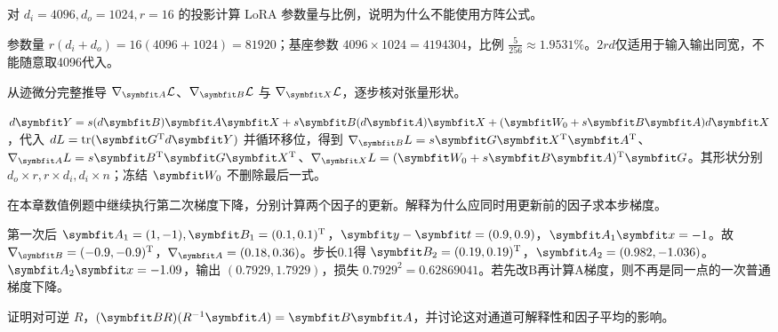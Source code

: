 
\begin{exercises}
\begin{exercise} 对 $d_i=4096,d_o=1024,r=16$ 的投影计算 LoRA 参数量与比例，说明为什么不能使用方阵公式。

\begin{solution}
参数量 $r(d_i+d_o)=16(4096+1024)=81920$；基座参数 $4096\times1024=4194304$，比例 $\frac{5}{256}\approx1.9531\%$。$2rd$仅适用于输入输出同宽，不能随意取4096代入。
\end{solution}
\end{exercise}

\begin{exercise} 从迹微分完整推导 $\nabla_{\mat{A}}\mathcal L$、$\nabla_{\mat{B}}\mathcal L$ 与 $\nabla_{\mat{X}}\mathcal L$，逐步核对张量形状。

\begin{solution}
$d\mat{Y}=s(d\mat{B})\mat{A}\mat{X}+s\mat{B}(d\mat{A})\mat{X}+(\mat{W}_0+s\mat{B}\mat{A})d\mat{X}$，代入 $dL=\operatorname{tr}(\mat{G}^{\mathrm{T}} d\mat{Y})$ 并循环移位，得到 $\nabla_{\mat{B}}L=s\mat{G}\mat{X}^{\mathrm{T}}\mat{A}^{\mathrm{T}}$、$\nabla_{\mat{A}}L=s\mat{B}^{\mathrm{T}}\mat{G}\mat{X}^{\mathrm{T}}$、$\nabla_{\mat{X}}L=(\mat{W}_0+s\mat{B}\mat{A})^{\mathrm{T}}\mat{G}$。其形状分别 $d_o\times r,r\times d_i,d_i\times n$；冻结 $\mat{W}_0$ 不删除最后一式。
\end{solution}
\end{exercise}

\begin{exercise} 在本章数值例题中继续执行第二次梯度下降，分别计算两个因子的更新。解释为什么应同时用更新前的因子求本步梯度。

\begin{solution}
第一次后 $\mat{A}_1=(1,-1),\mat{B}_1=(0.1,0.1)^{\mathrm{T}}$，$\vect{y}-\vect{t}=(0.9,0.9)$，$\mat{A}_1\vect{x}=-1$。故 $\nabla_{\mat{B}}=(-0.9,-0.9)^{\mathrm{T}}$，$\nabla_{\mat{A}}=(0.18,0.36)$。步长0.1得 $\mat{B}_2=(0.19,0.19)^{\mathrm{T}}$，$\mat{A}_2=(0.982,-1.036)$。$\mat{A}_2\vect{x}=-1.09$，输出 $(0.7929,1.7929)$，损失 $0.7929^2=0.62869041$。若先改B再计算A梯度，则不再是同一点的一次普通梯度下降。
\end{solution}
\end{exercise}

\begin{exercise}\optional 证明对可逆 $R$，$(\mat{B}R)(R^{-1}\mat{A})=\mat{B}\mat{A}$，并讨论这对通道可解释性和因子平均的影响。


\end{exercise}
\end{exercises}
